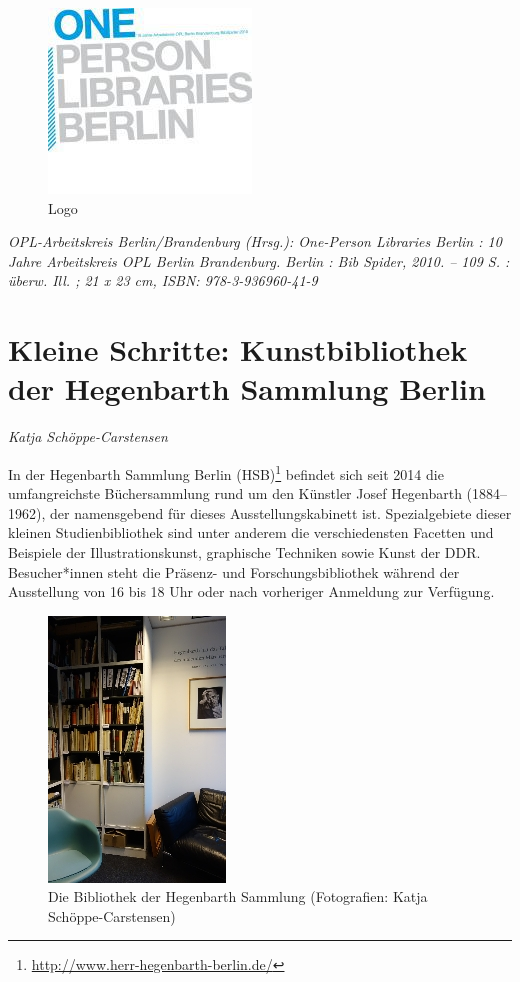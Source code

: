 \documentclass[a4paper,
fontsize=11pt,
oneside,
numbers=noperiodatend,
parskip=half-,
bibliography=totoc,
final
]{scrartcl}
\begin{document}
\begin{figure}
\centering
\includegraphics{img/Aleks_Einl_1.jpg}
\caption{Logo}
\end{figure}

\emph{OPL-Arbeitskreis Berlin/Brandenburg (Hrsg.): One-Person Libraries
Berlin : 10 Jahre Arbeitskreis OPL Berlin Brandenburg. Berlin : Bib
Spider, 2010. -- 109 S. : überw. Ill. ; 21 x 23 cm, ISBN:
978-3-936960-41-9}

\hypertarget{kleine-schritte-kunstbibliothek-der-hegenbarth-sammlung-berlin}{%
\section{Kleine Schritte: Kunstbibliothek der Hegenbarth Sammlung
Berlin}\label{kleine-schritte-kunstbibliothek-der-hegenbarth-sammlung-berlin}}

\emph{Katja Schöppe-Carstensen}

In der Hegenbarth Sammlung Berlin (HSB)\footnote{\url{http://www.herr-hegenbarth-berlin.de/}}
befindet sich seit 2014 die umfangreichste Büchersammlung rund um den
Künstler Josef Hegenbarth (1884--1962), der namensgebend für dieses
Ausstellungskabinett ist. Spezialgebiete dieser kleinen
Studienbibliothek sind unter anderem die verschiedensten Facetten und
Beispiele der Illustrationskunst, graphische Techniken sowie Kunst der
DDR. Besucher*innen steht die Präsenz- und Forschungsbibliothek während
der Ausstellung von 16 bis 18 Uhr oder nach vorheriger Anmeldung zur
Verfügung.

\begin{figure}
\centering
\includegraphics{img/Schoeppe_1.jpg}
\caption{Die Bibliothek der Hegenbarth Sammlung (Fotografien: Katja
Schöppe-Carstensen)}
\end{figure}
\end{document}
